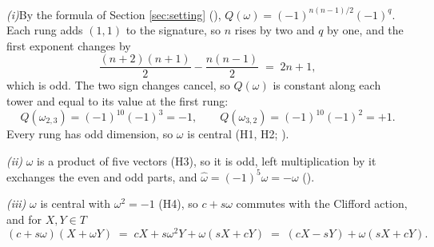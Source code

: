 \textit{(i)}\enspace By the formula of Section \ref{sec:setting} (), $Q(\omega) = (-1)^{n(n-1)/2}(-1)^{q}$. Each rung adds $(1,1)$ to the signature, so $n$ rises by two and $q$ by one, and the first exponent changes by
\[
\frac{(n+2)(n+1)}{2} - \frac{n(n-1)}{2} \;=\; 2n + 1,
\]
which is odd. The two sign changes cancel, so $Q(\omega)$ is constant along each tower and equal to its value at the first rung:
\[
Q(\omega_{2,3}) = (-1)^{10}(-1)^{3} = -1, \qquad Q(\omega_{3,2}) = (-1)^{10}(-1)^{2} = +1.
\]
Every rung has odd dimension, so $\omega$ is central (H1, H2; ).



\emph{(ii)}  $\omega$ is a product of five vectors (H3), so it is odd, left multiplication by it exchanges the even and odd parts, and $\hat{\omega} = (-1)^{5}\omega = -\omega$ ().



\emph{(iii)}  $\omega$ is central with $\omega^{2} = -1$ (H4), so $c + s\omega$ commutes with the Clifford action, and for $X, Y \in T$
\[
(c + s\omega)(X + \omega Y) \;=\; cX + s\omega^{2}Y + \omega(sX + cY) \;=\; (cX - sY) + \omega(sX + cY).
\]
